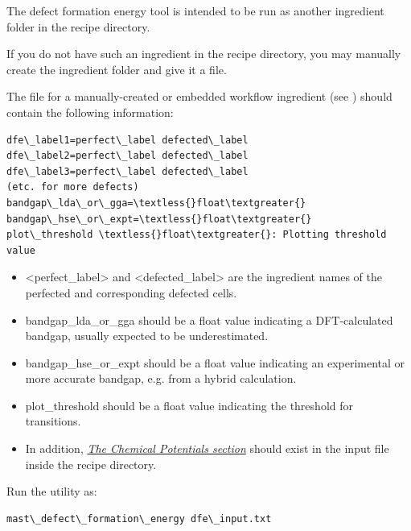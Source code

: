 \documentclass[letterpaper,10pt,english]{sphinxmanual}
\begin{document}
The defect formation energy tool is intended to be run as another ingredient folder in the recipe directory.

If you do not have such an ingredient in the recipe directory, you may manually create the ingredient folder and give it a  file.

The  file for a manually-created or embedded workflow ingredient (see ) should contain the following information:

\begin{Verbatim}[commandchars=\\\{\}]
dfe\_label1=perfect\_label defected\_label
dfe\_label2=perfect\_label defected\_label
dfe\_label3=perfect\_label defected\_label
(etc. for more defects)
bandgap\_lda\_or\_gga=\textless{}float\textgreater{}
bandgap\_hse\_or\_expt=\textless{}float\textgreater{}
plot\_threshold \textless{}float\textgreater{}: Plotting threshold value
\end{Verbatim}
\begin{itemize}
\item {} 
\textless{}perfect\_label\textgreater{} and \textless{}defected\_label\textgreater{} are the ingredient names of the perfected and corresponding defected cells.

\item {} 
bandgap\_lda\_or\_gga should be a float value indicating a DFT-calculated bandgap, usually expected to be underestimated.

\item {} 
bandgap\_hse\_or\_expt should be a float value indicating an experimental or more accurate bandgap, e.g. from a hybrid calculation.

\item {} 
plot\_threshold should be a float value indicating the threshold for transitions.

\item {} 
In addition, {\hyperref[3_1_7_chemicalpotentials::doc]{\emph{The Chemical Potentials section}}} should exist in the  input file inside the recipe directory.

\end{itemize}

Run the utility as:

\begin{Verbatim}[commandchars=\\\{\}]
mast\_defect\_formation\_energy dfe\_input.txt
\end{Verbatim}
\end{document}
